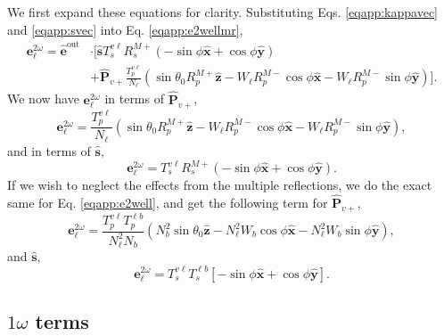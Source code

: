 We first expand these equations for clarity. Substituting Eqs.
\eqref{eqapp:kappavec} and \eqref{eqapp:svec} into Eq. \eqref{eqapp:e2wellmr},
\begin{equation*}\label{eqapp:e2wexpmr}
\begin{split}
\mathbf{e}^{2\omega}_{\ell} = \hat{\mathbf{e}}^{\mathrm{out}}&\cdot
\Bigg[
\hat{\mathbf{s}}T_{s}^{v\ell}R^{M+}_{s}
\left(
- \sin\phi\hat{\mathbf{x}}
+ \cos\phi\hat{\mathbf{y}}
\right)\\
&+ \hat{\mathbf{P}}_{v+}\frac{T^{v\ell}_{p}}{N_{\ell}}
\left(
  \sin\theta_{0}R^{M+}_{p}\hat{\mathbf{z}}
- W_{\ell}R^{M-}_{p}\cos\phi\hat{\mathbf{x}}
- W_{\ell}R^{M-}_{p}\sin\phi\hat{\mathbf{y}}
\right)
\Bigg].
\end{split}
\end{equation*}
We now have $\mathbf{e}^{2\omega}_{\ell}$ in terms of
$\hat{\mathbf{P}}_{v+}$,
\begin{equation}\label{eqapp:e2wpmr}
\mathbf{e}^{2\omega}_{\ell} =
\frac{T^{v\ell}_{p}}{N_{\ell}}
\left(
  \sin\theta_{0}R^{M+}_{p}\hat{\mathbf{z}}
- W_{\ell}R^{M-}_{p}\cos\phi\hat{\mathbf{x}}
- W_{\ell}R^{M-}_{p}\sin\phi\hat{\mathbf{y}}
\right),
\end{equation}
and in terms of $\hat{\mathbf{s}}$,
\begin{equation}\label{eqapp:e2wsmr}
\mathbf{e}^{2\omega}_{\ell} =
T_{s}^{v\ell}R^{M+}_{s}
\left(
- \sin\phi\hat{\mathbf{x}}
+ \cos\phi\hat{\mathbf{y}}
\right).
\end{equation}
If we wish to neglect the effects from the multiple reflections, we do the exact
same for Eq. \eqref{eqapp:e2well}, and get the following term for
$\hat{\mathbf{P}}_{v+}$,
\begin{equation}\label{eqapp:e2wp}
\mathbf{e}^{2\omega}_{\ell} =
\frac{T^{v\ell}_{p}T^{\ell b}_{p}}
     {N^{2}_{\ell}N_{b}}
\left(
  N^{2}_{b}\sin\theta_{0}\hat{\mathbf{z}}
- N^{2}_{\ell}W_{b}\cos\phi\hat{\mathbf{x}}
- N^{2}_{\ell}W_{b}\sin\phi\hat{\mathbf{y}}
\right),
\end{equation}
and $\hat{\mathbf{s}}$,
\begin{equation}\label{eqapp:e2ws}
\mathbf{e}^{2\omega}_{\ell} 
= T^{v\ell}_{s}T^{\ell b}_{s}
\left[-\sin\phi\hat{\mathbf{x}} + \cos\phi\hat{\mathbf{y}}\right].
\end{equation}


\subsection{\texorpdfstring{$1\omega$}{1w} terms}

